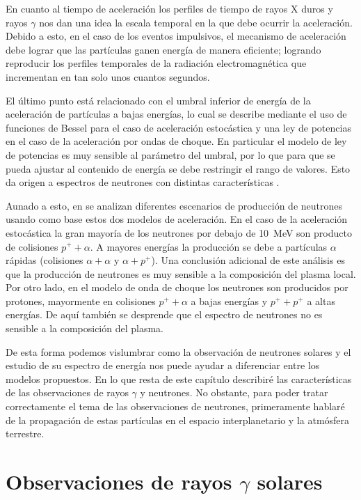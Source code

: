 En cuanto al tiempo de aceleración los perfiles de tiempo de rayos X duros y rayos $\gamma$ nos dan una idea la escala temporal en la que debe ocurrir la aceleración. Debido a esto, en el caso de los eventos impulsivos, el mecanismo de aceleración debe lograr que las partículas ganen energía de manera eficiente; logrando reproducir los perfiles temporales de la radiación electromagnética que incrementan en tan solo unos cuantos segundos.

El último punto está relacionado con el umbral inferior de energía de la aceleración de partículas a bajas energías, lo cual se describe mediante el uso de funciones de Bessel para el caso de aceleración estocástica y una ley de potencias en el caso de la aceleración por ondas de choque. En particular el modelo de ley de potencias es muy sensible al parámetro del umbral, por lo que para que se pueda ajustar al contenido de energía se debe restringir el rango de valores. Esto da origen a espectros de neutrones con distintas características \cite{tsuchiyaphd}.

Aunado a esto, en \cite{murphy87} se analizan diferentes escenarios de producción de neutrones usando como base estos dos modelos de aceleración. En el caso de la aceleración estocástica la gran mayoría de los neutrones por debajo de \SI{10}{\mega\electronvolt} son producto de colisiones $p^{+}+\alpha$. A mayores energías la producción se debe a partículas $\alpha$ rápidas (colisiones $\alpha+\alpha$ y $\alpha+p^{+}$). Una conclusión adicional de este análisis es que la producción de neutrones es muy sensible a la composición del plasma local. Por otro lado, en el modelo de onda de choque los neutrones son producidos por protones, mayormente en colisiones $p^{+}+\alpha$ a bajas energías y $p^{+}+p^{+}$ a altas energías. De aquí también se desprende que el espectro de neutrones no es sensible a la composición del plasma.

De esta forma podemos vislumbrar como la observación de neutrones solares y el estudio de su espectro de energía nos puede ayudar a diferenciar entre los modelos propuestos. En lo que resta de este capítulo describiré las características de las observaciones de rayos $\gamma$ y neutrones. No obstante, para poder tratar correctamente el tema de las observaciones de neutrones, primeramente hablaré de la propagación de estas partículas en el espacio interplanetario y la atmósfera terrestre.

\section{Observaciones de rayos $\gamma$ solares}

